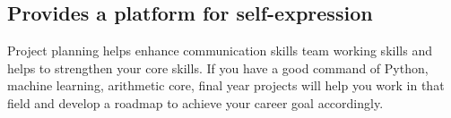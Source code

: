 \subsection{Provides a platform for self-expression}
Project planning helps enhance communication skills team working skills and helps to strengthen your core skills. If you have a good command of Python, machine learning, arithmetic core, final year projects will help you work in that field and develop a roadmap to achieve your career goal accordingly.

